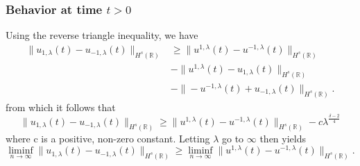\documentclass{beamer}
\newcommand{\rr}{\mathbb{R}}
\begin{document}
\begin{frame}
	\frametitle{ Behavior at time  $t>0$}
%
%
%  
%

Using the reverse triangle inequality, we 
have
%
%
%
%
%
\begin{equation*} \label{appleHR-slns-differ-t-pos}
\begin{split}
\|
u_{1,\lambda}(t)
-
u_{- 1,\lambda}(t)
\|_{H^s(\rr)}
&
\ge
\|
u^{1,\lambda}(t)
-
u^{- 1,\lambda}(t)
\|_{H^s(\rr)}
\\
& -
\|
u^{1,\lambda}(t)
-
u_{1,\lambda}(t)
\|_{H^s(\rr)}
\\
& -
\|
-u^{-1,\lambda}(t)
+
u_{-1,\lambda}(t)
\|_{H^s(\rr)} .
\end{split}
\end{equation*}
%
%
%
%
from which it follows that
%
%
%
%
\begin{equation*} \label{appleHR-slns-differ-t-pos-est}
\|
u_{1,\lambda}(t)
-
u_{- 1,\lambda}(t)
\|_{H^s(\rr)}
\ge
\|
u^{1,\lambda}(t)
-
u^{- 1,\lambda}(t)
\|_{H^s(\rr)}
-
c \lambda^{\frac{\delta - 2}{4}}
\end{equation*}
%
%
where c is a positive, non-zero constant. Letting $\lambda$ go to $\infty$ 
then yields
%
%
%
\begin{equation*} \label{appleHR-slns-to-ap-est}
\liminf_{n\to\infty}
\|
u_{1,\lambda}(t)
-
u_{- 1,\lambda}(t)
\|_{H^s(\rr)}
\ge
\liminf_{n\to\infty}
\|
u^{1,\lambda}(t)
-
u^{- 1,\lambda}(t)
\|_{H^s(\rr)}.
\end{equation*}
%
%
%
\end{frame}
\end{document}
